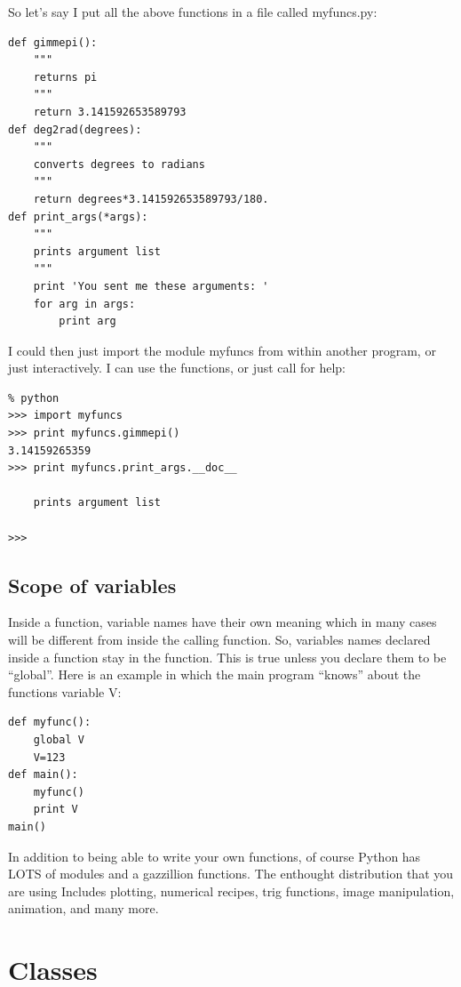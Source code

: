 \documentclass[11pt]{book}
\begin{document}
{So let's say I put all the above functions in a file called {\color{blue}myfuncs.py}:

{ \color{blue} \begin{verbatim}
def gimmepi():  
    """
    returns pi
    """
    return 3.141592653589793
def deg2rad(degrees):  
    """
    converts degrees to radians
    """
    return degrees*3.141592653589793/180.
def print_args(*args):
    """
    prints argument list
    """
    print 'You sent me these arguments: '
    for arg in args:
        print arg
\end{verbatim}}

\noindent I could then just import the module {\color{blue}myfuncs} from within another program, or just interactively.  I can use the functions, or just call for help:

{ \color{blue} \begin{verbatim}
% python
>>> import myfuncs
>>> print myfuncs.gimmepi()
3.14159265359
>>> print myfuncs.print_args.__doc__

    prints argument list

>>>
\end{verbatim}}

\subsection{Scope of variables}

Inside a function,  variable names have their own meaning  which in many cases will be different from inside the calling function.  So,  variables names declared inside a function stay in the function.  This is true unless you declare them to be ``global''.
Here is an example in which the main program  ``knows'' about the functions variable {\color{blue}V}:  

{ \color{blue} \begin{verbatim}
def myfunc():
    global V
    V=123
def main():
    myfunc()
    print V
main()
\end{verbatim}}







In addition to being able to write your own functions, of course 
Python has LOTS of modules and a gazzillion functions. The enthought distribution that you are using
Includes plotting, numerical recipes, trig functions, image manipulation, animation,  and many more. 



\section{Classes}

}
\end{document}
